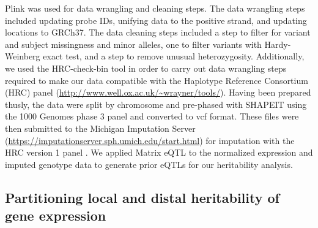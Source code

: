 \documentclass[10pt,letterpaper]{article}
\begin{document}
Plink \cite{chang2015second} was used for data wrangling and cleaning steps. The data wrangling steps included updating probe IDs, unifying data to the positive strand, and updating locations to GRCh37. The data cleaning steps included a step to filter for variant and subject missingness and minor alleles, one to filter variants with Hardy-Weinberg exact test, and a step to remove unusual heterozygosity. Additionally, we used the HRC-check-bin tool in order to carry out data wrangling steps required to make our data compatible with the Haplotype Reference Consortium (HRC) panel (\url{http://www.well.ox.ac.uk/~wrayner/tools/}). Having been prepared thusly, the data were split by chromosome and pre-phased with SHAPEIT \cite{delaneau2012linear} using the 1000 Genomes phase 3 panel and converted to vcf format. These files were then submitted to the Michigan Imputation Server (\url{https://imputationserver.sph.umich.edu/start.html}) \cite{Howie_2012,Fuchsberger_2014} for imputation with the HRC version 1 panel \cite{mccarthy2015reference}.  We applied Matrix eQTL \cite{shabalin2012matrix} to the normalized expression and imputed genotype data to generate prior eQTLs for our heritability analysis.

\subsection*{Partitioning local and distal heritability of gene
expression}\label{partitioning-local-and-distal-heritability-of-gene-expression}
\end{document}
